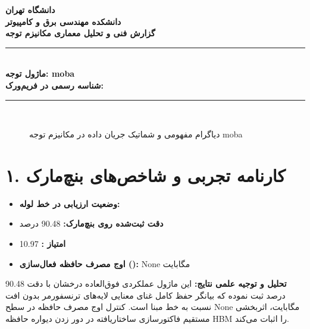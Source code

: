 \documentclass[12pt,a4paper]{article}
\begin{document}
\begin{center}
{\Large\bfseries دانشگاه تهران}\\[0.2cm]
{\large\bfseries دانشکده مهندسی برق و کامپیوتر}\\[0.2cm]
{\large\bfseries گزارش فنی و تحلیل معماری مکانیزم توجه}\\[0.5cm]
\rule{\linewidth}{1pt}\\[0.3cm]
{\LARGE\bfseries ماژول توجه: moba}\\[0.2cm]
{\large \textbf{شناسه رسمی در فریم‌ورک:} }\\[0.2cm]
\rule{\linewidth}{1pt}\\[0.5cm]
\end{center}

\begin{figure}[H]
\centering
{}
\caption{دیاگرام مفهومی و شماتیک جریان داده در مکانیزم توجه moba}
\end{figure}

\section*{۱. کارنامه تجربی و شاخص‌های بنچ‌مارک}
\begin{itemize}
\item \textbf{وضعیت ارزیابی در خط لوله:} 
\item \textbf{دقت ثبت‌شده روی بنچ‌مارک:} 90.48 درصد
\item \textbf{امتیاز :} 10.97
\item \textbf{اوج مصرف حافظه فعال‌سازی ():} None مگابایت
\end{itemize}
\textbf{تحلیل و توجیه علمی نتایج:} این ماژول عملکردی فوق‌العاده درخشان با دقت 90.48 درصد ثبت نموده که بیانگر حفظ کامل غنای معنایی لایه‌های ترنسفورمر بدون افت نسبت به خط مبنا است. کنترل اوج مصرف حافظه در سطح None مگابایت، اثربخشی مستقیم فاکتورسازی ساختاریافته در دور زدن دیواره حافظه HBM را اثبات می‌کند.
\end{document}
